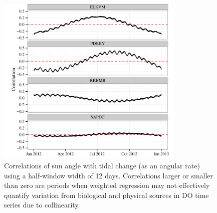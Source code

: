 \documentclass[letterpaper,12pt,oneside]{article}\usepackage[]{graphicx}\usepackage[]{color}
\newenvironment{knitrout}{}{} %
\begin{document}
\centering\vspace*{\fill}
\begin{knitrout}
\color{fgcolor}\begin{figure}[!ht]


{\centering \includegraphics[width=0.8\textwidth]{figure/move_corrs} 

}

\caption[Correlations of sun angle with tidal change (as an angular rate) using a half-window width of 12 days]{Correlations of sun angle with tidal change (as an angular rate) using a half-window width of 12 days.  Correlations larger or smaller than zero are periods when weighted regression may not effectively quantify variation from biological and physical sources in \ac{DO} time series due to collinearity.\label{fig:move_corrs}}
\end{figure}


\end{knitrout}
\end{document}
